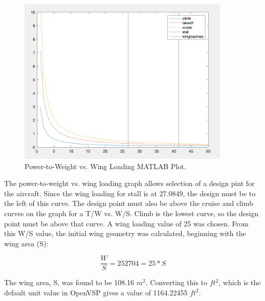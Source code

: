 \documentclass{article}
\begin{document}
 \begin{figure}[H]
 \centering
    \includegraphics[width=0.90\textwidth]{Figures/Powerload.png}
    \caption[Power-to-Weight vs. Wing Loading MATLAB Plot]{Power-to-Weight vs. Wing Loading MATLAB Plot. \label{fig:Powerloading} }
 \end{figure}
 
 

The power-to-weight vs. wing loading graph allows selection of a design pint for the aircraft. Since the wing loading for stall is at 27.0849, the  design must be to the left of this curve. The design point must also be above the cruise and climb curves on the graph for a T/W vs. W/S. Climb is the lowest curve, so the design point must be above that curve. A wing loading value of 25 was chosen. From this W/S value, the initial wing geometry was calculated, beginning with the wing area (S): 

\begin{equation}
    \frac{W}{S} = 25
    2704 = 25*S
\end{equation}

The wing area, S, was found to be 108.16 ${m^{2}}$. Converting this to ${ft^{2}}$, which is the default unit value in OpenVSP gives a value of 1164.22455 ${ft^{2}}$. 
\end{document}
